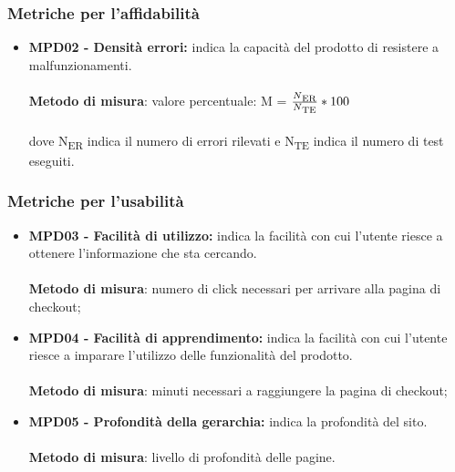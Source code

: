 \subsubsection{Metriche per l'affidabilit\`a}
\begin{itemize}
    \item \textbf{MPD02 - Densità errori:} indica la capacità del prodotto di resistere a malfunzionamenti.\\
    \\\textbf{Metodo di misura}: valore percentuale: M = $\frac{N\textsubscript{ER}}{N\textsubscript{TE}}*100$ \\
    \\dove N\textsubscript{ER} indica il numero di errori rilevati e N\textsubscript{TE} indica il numero di test eseguiti.
\end{itemize}
 
\subsubsection{Metriche per l'usabilit\`a}
\begin{itemize}
    \item \textbf{MPD03 - Facilità di utilizzo:} indica la facilità con cui l'utente riesce a ottenere l'informazione che sta cercando.\\
    \\\textbf{Metodo di misura}: numero di click necessari per arrivare alla pagina di checkout;
    \item \textbf{MPD04 - Facilità di apprendimento:} indica la facilità con cui l'utente riesce a imparare l'utilizzo delle funzionalità del prodotto.\\
    \\\textbf{Metodo di misura}: minuti necessari a raggiungere la pagina di checkout;
    \item \textbf{MPD05 - Profondità della gerarchia:} indica la profondità del sito.\\
    \\\textbf{Metodo di misura}: livello di profondità delle pagine.
\end{itemize}

